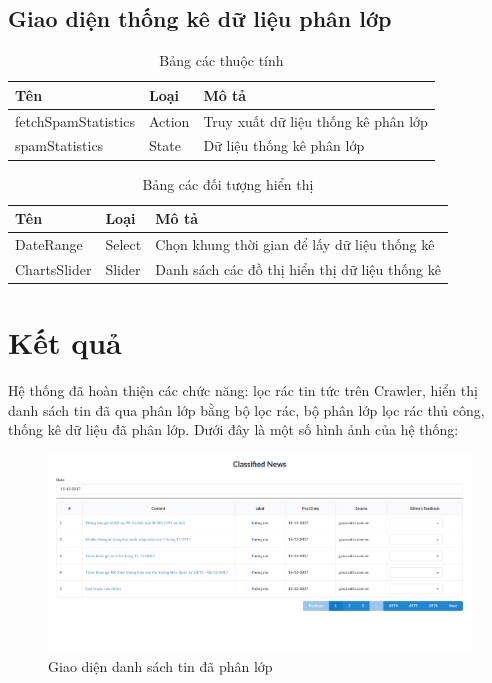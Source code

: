   \subsection{Giao diện thống kê dữ liệu phân lớp}
  \begin{table}[H]
    \centering
    \setlength{\tabcolstep}{12pt}
    \begin{tabular}{@{}lll@{}} \toprule
      Tên  & Loại   & Mô tả \\ \midrule
      fetchSpamStatistics &  Action   &  Truy xuất dữ liệu thống kê phân lớp \\
      spamStatistics  &  State  & Dữ liệu thống kê phân lớp \\ \bottomrule
    \end{tabular}
    \caption{Bảng các thuộc tính}
  \end{table}

  \begin{table}[H]
    \centering
    \setlength{\tabcolstep}{12pt}
    \begin{tabular}{@{}lll@{}} \toprule
      Tên  & Loại   & Mô tả \\ \midrule
      DateRange   &  Select & Chọn khung thời gian để lấy dữ liệu thống kê \\
      ChartsSlider   & Slider &  Danh sách các đồ thị hiển thị dữ liệu thống kê \\ \bottomrule
    \end{tabular}
    \caption{Bảng các đối tượng hiển thị}
  \end{table}
\section{Kết quả}
Hệ thống đã hoàn thiện các chức năng: lọc rác tin tức trên Crawler, hiển thị danh sách tin đã qua phân lớp bằng bộ lọc rác, bộ phân lớp lọc rác thủ công, thống kê dữ liệu đã phân lớp. Dưới đây là một số hình ảnh của hệ thống:

\begin{figure}[H]
	\centering
	\includegraphics[width=1\linewidth]{Chapter3/Chapter3Figs/Classified.png}
	\caption{Giao diện danh sách tin đã phân lớp}
	\label{fig:streaming}
\end{figure}

